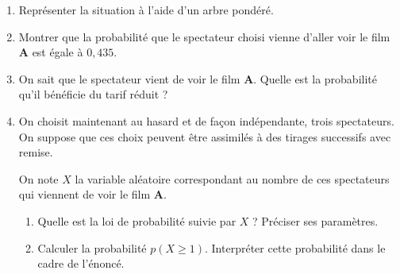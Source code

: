 \begin{enumerate}
     \item %
     Représenter la situation à l'aide d'un arbre pondéré.
     \item %
     Montrer que la probabilité que le spectateur choisi vienne d'aller voir le film \textbf{A} est égale à $0,435$.
     \item %
     On sait que le spectateur vient de voir le film \textbf{A}. Quelle est la probabilité qu'il bénéficie du tarif réduit ?
     \item %
     On choisit maintenant au hasard et de façon indépendante, trois spectateurs. On suppose que ces choix peuvent être assimilés à des tirages successifs avec remise.
     \par
     On note $X$ la variable aléatoire correspondant au nombre de ces spectateurs qui viennent de voir le film \textbf{A}.
     \par
     \begin{enumerate}
          \item %
          Quelle est la loi de probabilité suivie par $X$ ? Préciser ses paramètres.
          \item %
          Calculer la probabilité $p(X \geqslant 1)$. Interpréter cette probabilité dans le cadre de l'énoncé.
          \par
     \end{enumerate}
     \par
\end{enumerate}
